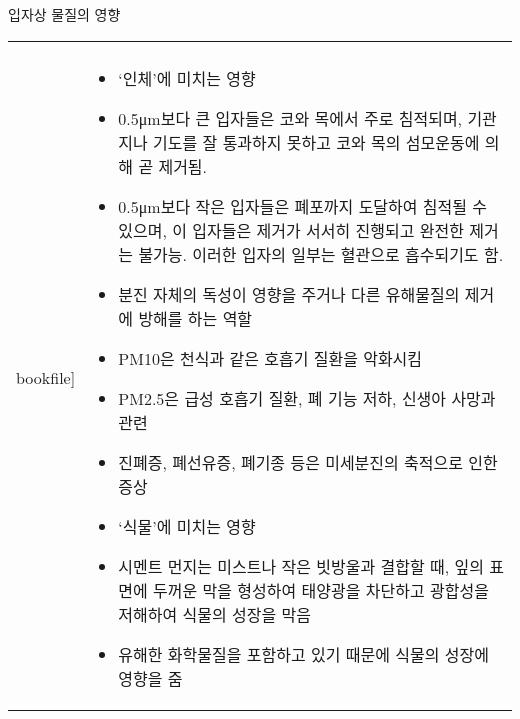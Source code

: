 \begin{frame}[t]{입자상 물질의 영향}
	\begin{tabular}{ll}
		\begin{minipage}[t]{0.3\textwidth}\scriptsize
			\begin{figure}[t]
				\texttt{[image: \\bookfile]}
			\end{figure}
		\end{minipage}	
		&
		\begin{minipage}[t]{0.65\textwidth} \scriptsize	
			\begin{itemize}
				\item ‘인체’에 미치는 영향
				\item 0.5μm보다 큰 입자들은 코와 목에서 주로 침적되며, 기관지나 기도를 잘 통과하지 못하고 코와 목의 섬모운동에 의해 곧 제거됨.
				\item 0.5μm보다 작은 입자들은 폐포까지 도달하여 침적될 수 있으며, 이 입자들은 제거가 서서히 진행되고 완전한 제거는 불가능. 이러한 입자의 일부는 혈관으로 흡수되기도 함.
				\item 분진 자체의 독성이 영향을 주거나 다른 유해물질의 제거에 방해를 하는 역할
				\item PM10은 천식과 같은 호흡기 질환을 악화시킴
				\item PM2.5은 급성 호흡기 질환, 폐 기능 저하, 신생아 사망과 관련
				\item 진폐증, 폐선유증, 폐기종 등은 미세분진의 축적으로 인한 증상
				
				\item ‘식물’에 미치는 영향
				\item 시멘트 먼지는 미스트나 작은 빗방울과 결합할 때, 잎의 표면에 두꺼운 막을 형성하여 태양광을 차단하고 광합성을 저해하여 식물의 성장을 막음
				\item 유해한 화학물질을 포함하고 있기 때문에 식물의 성장에 영향을 줌
								
			\end{itemize}

		\end{minipage}
	\end{tabular}
\end{frame}




